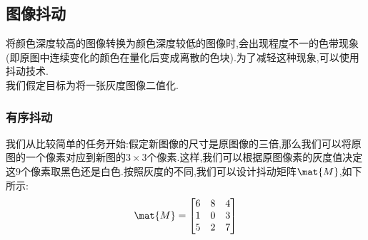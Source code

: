 \documentclass{ctexart}
\begin{document}
\subsection{图像抖动}
将颜色深度较高的图像转换为颜色深度较低的图像时,会出现程度不一的色带现象(即原图中连续变化的颜色在量化后变成离散的色块).为了减轻这种现象,可以使用抖动技术.\\
\indent 我们假定目标为将一张灰度图像二值化.
\subsubsection{有序抖动}
我们从比较简单的任务开始:假定新图像的尺寸是原图像的三倍,那么我们可以将原图的一个像素对应到新图的$3\times3$个像素.这样,我们可以根据原图像素的灰度值决定这$9$个像素取黑色还是白色.按照灰度的不同,我们可以设计抖动矩阵$\mat{M}$,如下所示:
\[\mat{M} = \begin{bmatrix}
    6 & 8 & 4 \\
    1 & 0 & 3 \\
    5 & 2 & 7
\end{bmatrix}\]
\end{document}
